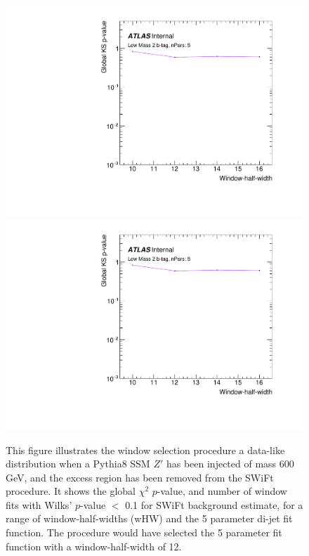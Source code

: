\begin{figure}[!htb]
\captionsetup[subfigure]{aboveskip=0pt,justification=centering}
\centering
{} {
  \includegraphics[width=0.45\linewidth, angle=0,page=2]{figs/Dibjet/LowMass/FitStudy/windowSel_corrFitCR_dataLike_v11_Zprimebb600_xsFactor1_removeWindow.pdf}
}
 {
  \includegraphics[width=0.45\linewidth, angle=0,page=4]{figs/Dibjet/LowMass/FitStudy/windowSel_corrFitCR_dataLike_v11_Zprimebb600_xsFactor1_removeWindow.pdf}
}
\vspace{10pt}
\caption{\label{fig:windowSel_Zprimebb600_xsFactor1}
  This figure illustrates the window selection procedure a data-like distribution when
  a Pythia8 SSM $Z'$ has been injected of mass 600 GeV, and the excess region has been removed from the SWiFt procedure.
  It shows the global $\chi^{2}$ $p$-value, %
  and number of window fits with Wilks' $p$-value $<$ 0.1 for SWiFt background estimate,
  for a range of window-half-widths (wHW) and the 5 parameter di-jet fit function.
  The procedure would have selected the 5 parameter fit function with a window-half-width of 12.
}
\end{figure}

\FloatBarrier

